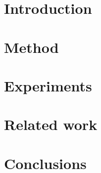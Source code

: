 \documentclass[aoas,preprint,authoryear]{imsart}
\begin{document}
\section{Introduction}





\section{Method}




\section{Experiments}


\section{Related work}


\section{Conclusions}



\end{document}
